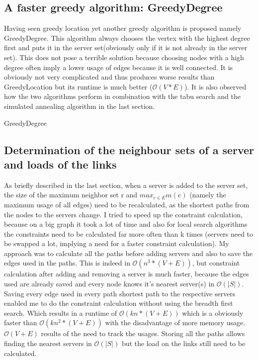 \documentclass [12pt]{article}
\begin{document}
\subsection{A faster greedy algorithm: GreedyDegree}
Having seen greedy location yet another greedy algorithm is proposed namely GreedyDegree. This algorithm always chooses the vertex with the
highest degree first and puts it in the server set(obviously only if it is not already in the server set). This does not pose
a terrible solution because choosing nodes with a high degree often imply a lower usage of edges because it is well connected. It is obviously not very complicated 
and thus produces worse results than GreedyLocation but its runtime is much better ($\mathcal O(V*E)$). It is also observed how 
the two algorithms perform in combination with the tabu search and the simulated annealing algorithm in the last section. 
\begin{algorithm}[H]
  \caption{GreedyDegree}
  \label{greedydeg}
\end{algorithm}

\subsection{Determination of the neighbour sets of a server and loads of the links}
As briefly described in the last section, when a server is added to the server set, the size of the maximum neighbor set r and
$ max_{e \in E}m(e)$ (namely the maximum usage of all edges) need to be recalculated, as the shortest paths from the nodes 
to the servers change. I tried to speed up the constraint calculation, 
because on a big graph it took a lot of time and also for local search algorithms the constraints need to be calculated
far more often than k times (servers need to be swapped a lot, implying a need for a faster constraint calculation).
My approach was to calculate all the paths before adding servers and also to save the edges used in the paths.
This is indeed in $\mathcal O(n^{3}*(V+E))$, but constraint calculation after adding and removing a server is much faster,
because the edges used are already saved and every node knows it's nearest server(s) in $\mathcal O(|S|)$. Saving 
every edge used in every path shortest path to the respective servers enabled me to do the constraint calculation without using the breadth first search.
Which results in a runtime of $\mathcal O(kn*(V+E))$ which is a obviously faster than $\mathcal O(kn^{2}*(V+E))$ with the disadvantage of more memory usage.
$\mathcal O(V+E)$ results of the need to track the usages. Storing all the paths allows finding the nearest servers in $\mathcal O(|S|)$ but the load on the links 
still need to be calculated.
\end{document}
